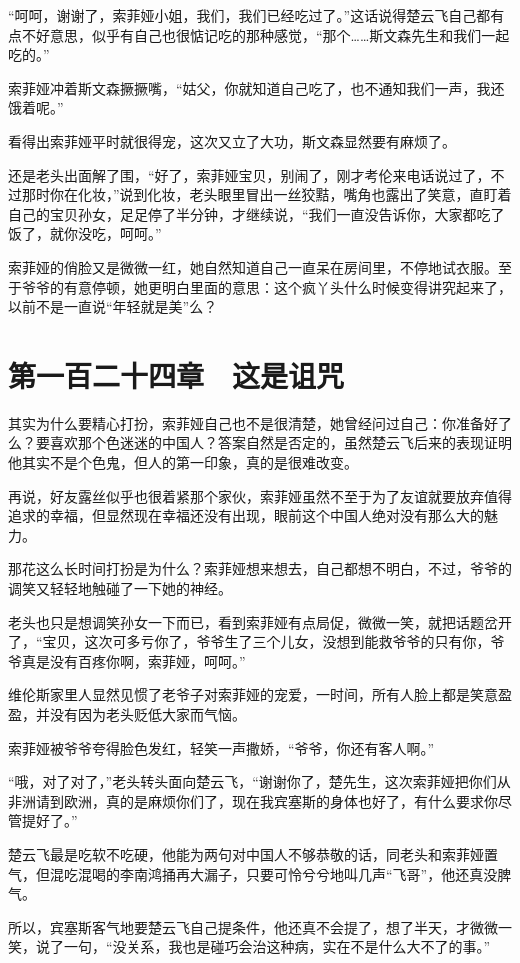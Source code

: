 “呵呵，谢谢了，索菲娅小姐，我们，我们已经吃过了。”这话说得楚云飞自己都有点不好意思，似乎有自己也很惦记吃的那种感觉，“那个……斯文森先生和我们一起吃的。”

索菲娅冲着斯文森撅撅嘴，“姑父，你就知道自己吃了，也不通知我们一声，我还饿着呢。”

看得出索菲娅平时就很得宠，这次又立了大功，斯文森显然要有麻烦了。

还是老头出面解了围，“好了，索菲娅宝贝，别闹了，刚才考伦来电话说过了，不过那时你在化妆，”说到化妆，老头眼里冒出一丝狡黠，嘴角也露出了笑意，直盯着自己的宝贝孙女，足足停了半分钟，才继续说，“我们一直没告诉你，大家都吃了饭了，就你没吃，呵呵。”

索菲娅的俏脸又是微微一红，她自然知道自己一直呆在房间里，不停地试衣服。至于爷爷的有意停顿，她更明白里面的意思：这个疯丫头什么时候变得讲究起来了，以前不是一直说“年轻就是美”么？

\section{第一百二十四章　这是诅咒}

其实为什么要精心打扮，索菲娅自己也不是很清楚，她曾经问过自己：你准备好了么？要喜欢那个色迷迷的中国人？答案自然是否定的，虽然楚云飞后来的表现证明他其实不是个色鬼，但人的第一印象，真的是很难改变。

再说，好友露丝似乎也很着紧那个家伙，索菲娅虽然不至于为了友谊就要放弃值得追求的幸福，但显然现在幸福还没有出现，眼前这个中国人绝对没有那么大的魅力。

那花这么长时间打扮是为什么？索菲娅想来想去，自己都想不明白，不过，爷爷的调笑又轻轻地触碰了一下她的神经。

老头也只是想调笑孙女一下而已，看到索菲娅有点局促，微微一笑，就把话题岔开了，“宝贝，这次可多亏你了，爷爷生了三个儿女，没想到能救爷爷的只有你，爷爷真是没有百疼你啊，索菲娅，呵呵。”

维伦斯家里人显然见惯了老爷子对索菲娅的宠爱，一时间，所有人脸上都是笑意盈盈，并没有因为老头贬低大家而气恼。

索菲娅被爷爷夸得脸色发红，轻笑一声撒娇，“爷爷，你还有客人啊。”

“哦，对了对了，”老头转头面向楚云飞，“谢谢你了，楚先生，这次索菲娅把你们从非洲请到欧洲，真的是麻烦你们了，现在我宾塞斯的身体也好了，有什么要求你尽管提好了。”

楚云飞最是吃软不吃硬，他能为两句对中国人不够恭敬的话，同老头和索菲娅置气，但混吃混喝的李南鸿捅再大漏子，只要可怜兮兮地叫几声“飞哥”，他还真没脾气。

所以，宾塞斯客气地要楚云飞自己提条件，他还真不会提了，想了半天，才微微一笑，说了一句，“没关系，我也是碰巧会治这种病，实在不是什么大不了的事。”

